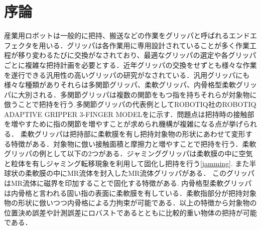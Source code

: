 \section{序論}
\label{sec:序論}
産業用ロボットは一般的に把持、搬送などの作業をグリッパと呼ばれるエンドエフェクタを用いる．グリッパは各作業用に専用設計されていることが多く作業工程が移り変わるたびに交換がなされており、最適なグリッパの選定や各グリッパごとに複雑な把持計画を必要とする．近年グリッパの交換をせずとも様々な作業を遂行できる汎用性の高いグリッパの研究がなされている．汎用グリッパにも様々な種類がありそれらは多関節グリッパ、柔軟グリッパ、内骨格型柔軟グリッパに大別される．多関節グリッパは複数の関節をもつ指を持ちそれらが対象物に倣うことで把持を行う\cite{takansetsu}.多関節グリッパの代表例としてROBOTIQ社のROBOTIQ ADAPTIVE GRIPPER 3-FINGER MODELをに示す．問題点は把持時の接触部を増やすために指の関節を増やすことが求められ機構が複雑になる点が挙げられる．
柔軟グリッパは把持部に柔軟膜を有し把持対象物の形状にあわせて変形する特徴がある．対象物に倣い接触面積と摩擦力と増やすことで把持を行う．柔軟グリッパの例として以下の2つがある．ジャミンググリッパは柔軟膜の中に空気と粒体を有しジャミング転移現象を利用して固化し把持を行う\ref{jamming}.
また半球状の柔軟膜の中にMR流体を封入したMR流体グリッパ\cite{MR}がある．
このグリッパはMR流体に磁界を印加することで固化する特徴がある.
内骨格型柔軟グリッパは内骨格と言われる固い指の表面に柔軟膜を有している．柔軟指部分が把持対象物の形状に倣いつつ内骨格による力拘束が可能である．以上の特徴から対象物の位置決め誤差や計測誤差にロバストであるとともに比較的重い物体の把持が可能である．

